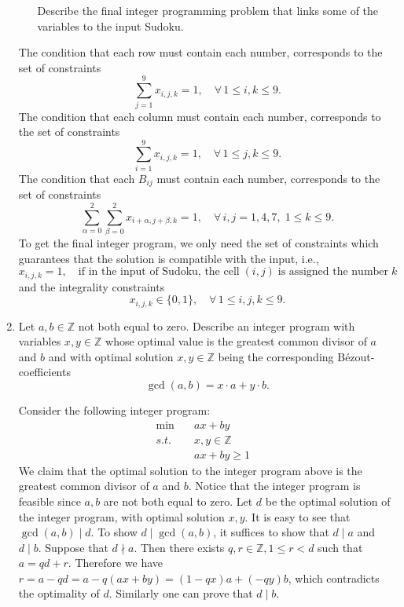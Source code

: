 \documentclass[11pt]{article}
\renewcommand{\leq}{\leqslant}
\renewcommand{\geq}{\geqslant}
\begin{document}
\begin{enumerate}[1)]
\begin{enumerate}[a)]
    Describe the final integer programming problem that links some of the variables to the input Sudoku. 
    
  \end{enumerate}

\begin{solution}
The condition that each row must contain each number, corresponds to the set of constraints
\[
\sum_{j=1}^9 x_{i,j,k} = 1,\quad \forall\, 1 \leq i,k \leq 9.
\]
The condition that each column must contain each number, corresponds to the set of constraints
\[
\sum_{i=1}^9 x_{i,j,k} = 1,\quad \forall\, 1 \leq j,k \leq 9.
\]
The condition that each $B_{ij}$ must contain each number, corresponds to the set of constraints
\[
\sum_{\alpha=0}^2 \sum_{\beta=0}^2 x_{i+\alpha,j+\beta,k} = 1,\quad \forall\, i,j=1,4,7,\; 1\leq k\leq 9.
\]
To get the final integer program, we only need the set of constraints which guarantees that the solution is compatible with the input, i.e., 
\[
x_{i,j,k} = 1,\quad \text{if in the input of Sudoku, the cell}\; (i,j) \;\text{is assigned the number} \; k
\]
and the integrality constraints
\[
x_{i,j,k} \in \{0,1\},\quad \forall\, 1 \leq i,j,k \leq 9.
\]
\end{solution}

\item Let $a, b ∈ℤ$ not both equal to zero. Describe an integer program with variables $x,y ∈ℤ$ whose optimal value is the greatest common divisor of $a$ and $b$ and with optimal solution $x,y ∈ℤ$ being the corresponding  Bézout-coefficients
  \begin{displaymath}
    \gcd(a,b) = x⋅a + y⋅b. 
  \end{displaymath}

\begin{solution}
Consider the following integer program:
\begin{align*}
  \min \quad & ax + by & \\
  s.t. \quad
  & x, y \in \mathbb{Z} \\
  & ax + by \geq 1
\end{align*}
We claim that the optimal solution to the integer program above is the greatest common divisor of $a$ and $b$. 
Notice that the integer program is feasible since $a,b$ are not both equal to zero. Let $d$ be the optimal solution of the integer program, with optimal solution $x,y$. 
It is easy to see that $\gcd(a,b) \mid d$. To show $d \mid \gcd(a,b)$, it suffices to show that $d\mid a$ and $d\mid b$. Suppose that $d\nmid a$. Then there exists $q,r \in \mathbb{Z}, 1\leq r < d$ such that $a=qd + r$. Therefore we have $r = a-qd = a-q(ax+by) = (1-qx)a+(-qy)b$, which contradicts the optimality of $d$. Similarly one can prove that $d\mid b$.
\end{solution}
 


\end{enumerate}
\end{document}
